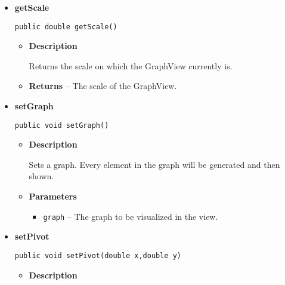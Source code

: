{{{{{{\begin{itemize}
{\begin{itemize}
{Adds a single vertex in the GraphView.
}
\item{
{\bf  Parameters}
  \begin{itemize}
   \item{
\texttt{x} -- The x position in the view.}
   \item{
\texttt{y} -- The y position in the view.}
   \item{
\texttt{Text} -- The text of the vertex.}
  \end{itemize}
}%
\end{itemize}
}%
\item{ 
{\bf  getScale}\\
\begin{lstlisting}[frame=none]
public double getScale()\end{lstlisting} %
\begin{itemize}
\item{
{\bf  Description}

Returns the scale on which the GraphView currently is.
}
\item{{\bf  Returns} -- 
The scale of the GraphView. 
}%
\end{itemize}
}%
\item{ 
{\bf  setGraph}\\
\begin{lstlisting}[frame=none]
public void setGraph()\end{lstlisting} %
\begin{itemize}
\item{
{\bf  Description}

Sets a graph. Every element in the graph will be generated and then shown.
}
\item{
{\bf  Parameters}
  \begin{itemize}
   \item{
\texttt{graph} -- The graph to be visualized in the view.}
  \end{itemize}
}%
\end{itemize}
}%
\item{ 
{\bf  setPivot}\\
\begin{lstlisting}[frame=none]
public void setPivot(double x,double y)\end{lstlisting} %
\begin{itemize}
\item{
{\bf  Description}

}
\end{itemize}}
\end{itemize}}}}}}}
